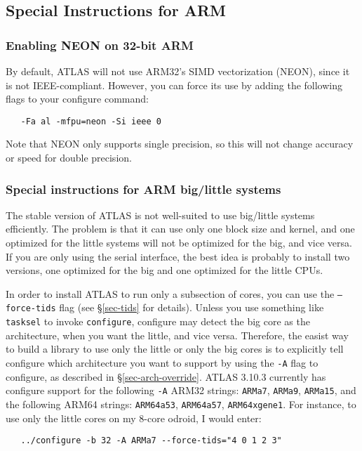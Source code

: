 \documentclass[11pt]{article}
\begin{document}
\subsection{Special Instructions for ARM}

\subsubsection{Enabling NEON on 32-bit ARM}
By default, ATLAS will not use ARM32's SIMD vectorization (NEON), since
it is not IEEE-compliant.  However, you can force its use by adding
the following flags to your configure command:
\begin{verbatim}
   -Fa al -mfpu=neon -Si ieee 0
\end{verbatim}
Note that NEON only supports single precision, so this will not change
accuracy or speed for double precision.  

\subsubsection{Special instructions for ARM big/little systems}
The stable version of ATLAS is not well-suited to use big/little systems
efficiently.   The problem is that it can use only one block size and
kernel, and one optimized for the little systems will not be optimized
for the big, and vice versa.  If you are only using the serial interface,
the best idea is probably to install two versions, one optimized 
for the big and one optimized for the little CPUs.

In order to install ATLAS to run only a subsection of cores, you can use
the {\tt --force-tids} flag (see \S\ref{sec-tids} for details).  Unless
you use something like {\tt tasksel} to invoke {\tt configure}, configure
may detect the big core as the architecture, when you want the little, and
vice versa.  Therefore, the easist way to build a library to use only
the little or only the big cores is to
explicitly tell configure which architecture you want to support by using
the {\tt -A} flag to configure, as described in \S\ref{sec-arch-override}.
ATLAS 3.10.3 currently has configure support for the following {\tt -A} 
ARM32 strings: \texttt{ARMa7}, \texttt{ARMa9}, \texttt{ARMa15},
and the following ARM64 strings:
\texttt{ARM64a53}, \texttt{ARM64a57}, \texttt{ARM64xgene1}.
For instance, to use only the little cores on my 8-core odroid, I would
enter:
\begin{verbatim}
   ../configure -b 32 -A ARMa7 --force-tids="4 0 1 2 3"
\end{verbatim}
\end{document}
